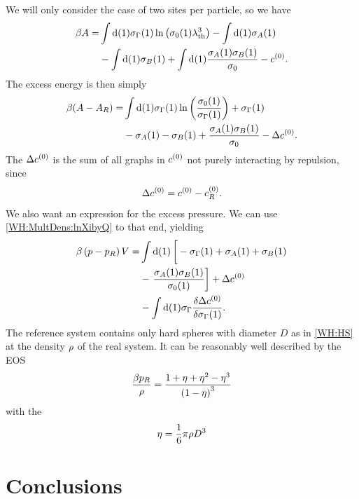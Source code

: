 \documentclass[8.5pt,twoside,twocolumn]{article}
\newcommand\di{\te{d}}
\newcommand\cze{\enmat{c^{(0)}}}
\newcommand\lath{\enmat{\la_\te{th}}}
\newcommand\inon{\enmat{\int\di(1)}}
\theoremstyle{standard}
\begin{document}
 
We will only consider the case of two sites per particle, so we have
\begin{equation}
\begin{aligned}
\be A =& \inon \siga(1)\ln\rb{\siz(1)\lath^3} - \inon \si_A(1) \\
 &-\inon\si_B(1) + \inon \frac{\si_A(1)\si_B(1)}{\si_0} - \cze.
\end{aligned}
\label{TPT:beA}
\end{equation}
The excess energy is then simply
\begin{equation}
\begin{aligned}
\be (A-A_R) =& \inon \siga(1)\ln\rb{\frac{\siz(1)}{\siga(1)}} + \siga(1) \\
&- \si_A(1) -\si_B(1) + \frac{\si_A(1)\si_B(1)}{\si_0} - \Dl\cze. %
\end{aligned}
\label{TPT:excessEnergy}
\end{equation}
The $\Dl\cze$ is the sum of all graphs in $\cze$ not purely interacting by repulsion, since
\begin{equation}
\Dl\cze=\cze-\chs.
\end{equation}
We also want an expression for the excess pressure. We can use \eqref{WH:MultDens:lnXibyQ}
to that end, yielding
\begin{equation}
\begin{aligned}
\be \rb{p-p_R}V =& \inon \lt[\vphantom{\frac 1 2}-\siga(1)+\si_A(1)+\si_B(1)\rt.\\
&-\lt.\frac{\si_A(1)\si_B(1)}{\siz(1)}\rt] + \Dl\cze \\
&- \inon\siga\delti{\Dl\cze}{\siga(1)}.
\end{aligned}
\end{equation}
The reference system contains only hard spheres with diameter $D$ as in \eqref{WH:HS} at the
density $\rho$ of the real system. It can be reasonably well described by
the  EOS\cite{CarnahanStarling}
\begin{equation}
\frac{\beta p_R}{\rho}=\frac{1+\eta+\eta^2-\eta^3}{\left({1-\eta}\right)^3}
\end{equation}
with the 
\begin{equation}
\eta=\frac 1 6 \pi\rho D^3
\end{equation}
\section{Conclusions}
\label{Con}
\end{document}
